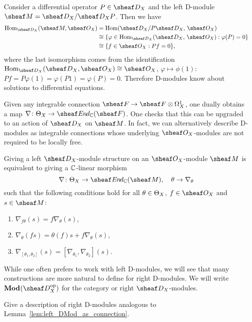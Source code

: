 \documentclass[number-in-sections,a4paper]{notes}
\begin{document}
\begin{Example}
    Consider a differential operator $P \in \sD_X$ and the left D-module $\sheaf M = \sD_X/\sD_XP$.
    Then we have
    \begin{align*}
        \Hom_{\sD_X}(\sheaf M, \sO_X) & = \Hom(\sD_X/P\sD_X,\, \sO_X) \\
        & \cong \{ \varphi \in \Hom_{\sD_X}(\sD_X,\, \sO_X) : \varphi(P) = 0 \} \\
        & \cong \{ f \in \sO_X : Pf = 0 \},
    \end{align*}
    where the last isomorphism comes from the identification $\Hom_{\sD_X}(\sD_X, \sO_X) \cong \sO_X$, $\varphi \mapsto \phi(1)$: $Pf = P\varphi(1) = \varphi(P1) = \varphi(P) = 0$.
    Therefore D-modules know about solutions to differential equations.
\end{Example}
    
Given any integrable connection $\sheaf F \to \sheaf F \otimes \ctb X$, one dually obtains a map $\nabla\colon \tb X \to \sheafEnd_\CC(\sheaf F)$.
One checks that this can be upgraded to an action of $\sD_X$ on $\sheaf M$.
In fact, we can alternatively describe D-modules as integrable connections whose underlying $\sO_X$-modules are not required to be locally free.

\begin{Lemma}\label{lem:left_DMod_as_connection}
    Giving a left $\sD_X$-module structure on an $\sO_X$-module $\sheaf M$ is equivalent to giving a ${\mathbb{C}}$-linear morphism
    \[
        \nabla\colon \tb X \to \sheafEnd_\CC(\sheaf M), \quad \theta \to \nabla_\theta
    \]
    such that the following conditions hold for all $\theta \in \Theta_{X}$, $f \in \sO_X$ and $s \in \sheaf M$:
    \begin{enumerate}
        \item $\nabla_{f\theta}(s) = f\nabla_{\theta}(s)$,
        \item $\nabla_\theta(fs) = \theta(f)s + f\nabla_\theta(s)$,
        \item $\nabla_{[\theta_1,\theta_2]}(s) = [\nabla_{\theta_1},\nabla_{\theta_2}](s)$.
    \end{enumerate}
\end{Lemma}

While one often prefers to work with left D-modules, we will see that many constructions are more natural to define for right D-modules.
We will write $\catrDMod{X}$ for the category or right $\sD_X$-modules.

\begin{Exercise}
    Give a description of right D-modules analogous to Lemma~\ref{lem:left_DMod_as_connection}.
\end{Exercise}
\end{document}
